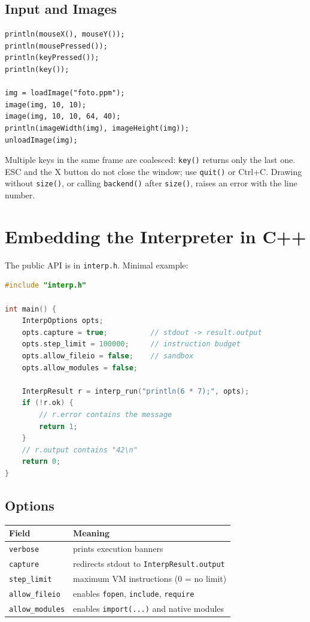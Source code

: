\documentclass[11pt,a4paper,oneside]{report}
\newcommand{\code}[1]{\texttt{#1}}
\newcommand{\file}[1]{\texttt{#1}}
\begin{document}
\section{Input and Images}
\begin{lstlisting}
println(mouseX(), mouseY());
println(mousePressed());
println(keyPressed());
println(key());

img = loadImage("foto.ppm");
image(img, 10, 10);
image(img, 10, 10, 64, 40);
println(imageWidth(img), imageHeight(img));
unloadImage(img);
\end{lstlisting}

Multiple keys in the same frame are coalesced: \code{key()} returns only
the last one. ESC and the X button do not close the window; use
\code{quit()} or Ctrl+C. Drawing without \code{size()}, or calling
\code{backend()} after \code{size()}, raises an error with the line
number.

\chapter{Embedding the Interpreter in C++}
\label{cap:embed}

The public API is in \file{interp.h}. Minimal example:

\begin{lstlisting}[language=C++]
#include "interp.h"

int main() {
    InterpOptions opts;
    opts.capture = true;          // stdout -> result.output
    opts.step_limit = 100000;     // instruction budget
    opts.allow_fileio = false;    // sandbox
    opts.allow_modules = false;

    InterpResult r = interp_run("println(6 * 7);", opts);
    if (!r.ok) {
        // r.error contains the message
        return 1;
    }
    // r.output contains "42\n"
    return 0;
}
\end{lstlisting}

\section{Options}
\begin{center}
\begin{tabular}{L{4cm}L{10cm}}
\toprule
Field & Meaning \\
\midrule
\code{verbose} & prints execution banners \\
\code{capture} & redirects stdout to \code{InterpResult.output} \\
\code{step\_limit} & maximum VM instructions (0 = no limit) \\
\code{allow\_fileio} & enables \code{fopen}, \code{include}, \code{require} \\
\code{allow\_modules} & enables \code{import(...)} and native modules \\
\bottomrule
\end{tabular}
\end{center}
\end{document}
